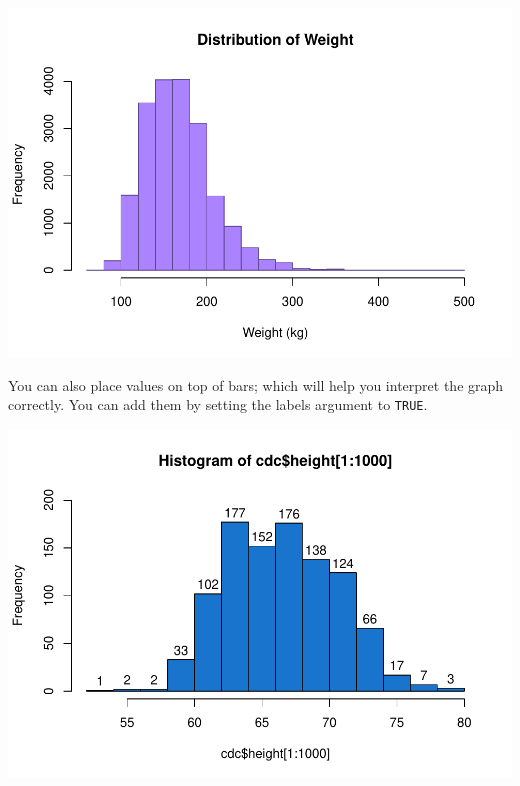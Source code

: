\documentclass[
]{book}
\newenvironment{Shaded}{\begin{snugshade}}{\end{snugshade}}
\newcommand{\DataTypeTok}[1]{\textcolor[rgb]{0.13,0.29,0.53}{#1}}
\newcommand{\DecValTok}[1]{\textcolor[rgb]{0.00,0.00,0.81}{#1}}
\newcommand{\KeywordTok}[1]{\textcolor[rgb]{0.13,0.29,0.53}{\textbf{#1}}}
\newcommand{\NormalTok}[1]{#1}
\newcommand{\OperatorTok}[1]{\textcolor[rgb]{0.81,0.36,0.00}{\textbf{#1}}}
\newcommand{\OtherTok}[1]{\textcolor[rgb]{0.56,0.35,0.01}{#1}}
\newcommand{\StringTok}[1]{\textcolor[rgb]{0.31,0.60,0.02}{#1}}
\begin{document}
\includegraphics{_main_files/figure-latex/unnamed-chunk-130-1.pdf}

You can also place values on top of bars; which will help you interpret the graph correctly. You can add them by setting the labels argument to \texttt{TRUE}.

\begin{Shaded}
\end{Shaded}

\includegraphics{_main_files/figure-latex/unnamed-chunk-131-1.pdf}
\end{document}
